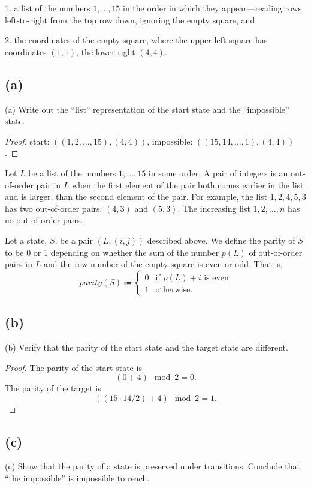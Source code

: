 \documentclass[14pt]{extarticle}
\begin{document}
1. a list of the numbers $1, \ldots, 15$ in the order in which they appear—reading rows left-to-right from the top row down, ignoring the empty square, and

2. the coordinates of the empty square, where the upper left square has coordinates $(1,1)$, the lower right $(4,4)$.

\subsection{(a)}
(a) Write out the “list” representation of the start state and the “impossible” state.
\begin{proof}
start: $((1, 2, \ldots, 15), (4, 4))$,
impossible: $((15, 14, \ldots, 1), (4, 4))$.
\end{proof}

Let $L$ be a list of the numbers $1, \ldots, 15$ in some order. A pair of integers is an out-of-order pair in $L$ when the first element of the pair both comes earlier in the list and is larger, than the second element of the pair. For example, the list $1, 2, 4, 5, 3$ has two out-of-order pairs: $(4,3)$ and $(5,3)$. The increasing list $1, 2, \ldots, n$ has no out-of-order pairs.

Let a state, $S$, be a pair $(L, (i, j))$ described above. We define the parity of $S$ to be 0 or 1 depending on whether the sum of the number $p(L)$ of out-of-order pairs in $L$ and the row-number of the empty square is even or odd. That is,
$$
parity(S) \Coloneqq \left\{
		\begin{array}{lr}
			0 & \text{if } p(L) + i \text{ is even}\\
			1 & \text{otherwise. }
     \end{array}
   \right.
$$

\subsection{(b)}
(b) Verify that the parity of the start state and the target state are different.
\begin{proof}
The parity of the start state is
$$
(0 + 4) \mod 2 = 0.
$$
The parity of the target is
$$
((15 \cdot 14/2) + 4) \mod 2 = 1.
$$
\end{proof}

\subsection{(c)}
(c) Show that the parity of a state is preserved under transitions. Conclude that “the impossible” is impossible to reach.
\end{document}

